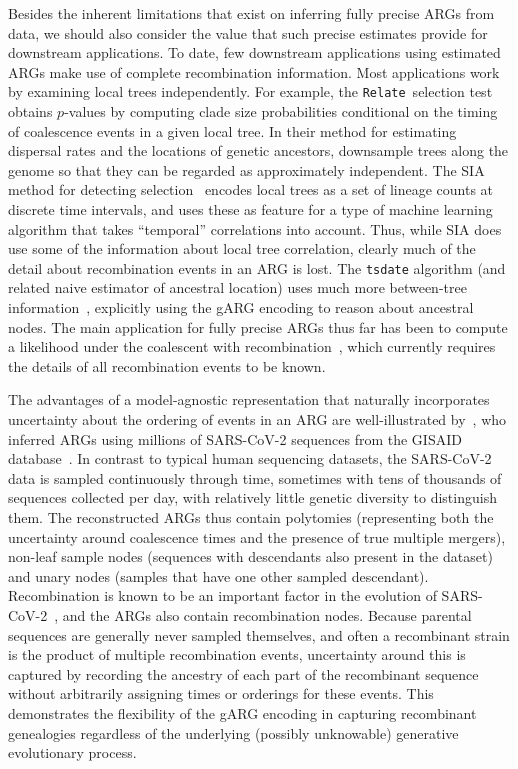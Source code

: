 \documentclass{article}
\newcommand{\relate}[0]{\texttt{Relate}}
\begin{document}
Besides the inherent limitations that exist on inferring fully
precise ARGs from data,
we should also consider the value that such precise estimates provide
for downstream applications.
To date, few downstream applications using estimated ARGs
make use of complete recombination information.
Most applications work by examining local trees independently.
For example, the \relate\ selection test~\citep{speidel2019method}
obtains $p$-values by computing clade size probabilities conditional on the timing of coalescence events in a given local tree.
In their method
for estimating dispersal rates and the locations of genetic
ancestors,
\citep{osmond2021estimating} downsample trees along the genome
so that they can be regarded as approximately independent.
The SIA method for detecting selection~\citep{hejase2022deep}
encodes local trees as a set of lineage counts at discrete
time intervals, and uses these as feature for a
type of machine learning algorithm
that takes ``temporal'' correlations into account. Thus,
while SIA does use some of the information about local tree correlation,
clearly much of the detail about recombination
events in an ARG is lost.
The \texttt{tsdate} algorithm (and related naive estimator
of ancestral location) uses much more between-tree
information~\citep{wohns2022unified}, explicitly using the gARG
encoding to reason about ancestral nodes.
The main application for fully precise ARGs thus far has been
to compute a likelihood under the coalescent with
recombination~\citep[e.g.][]{kuhner2000maximum,mahmoudi2022bayesian},
which currently requires the details of all recombination
events to be known.

The advantages of a model-agnostic representation that naturally
incorporates uncertainty about the ordering of events in an ARG are well-illustrated by~\cite{zhan2023towards}, who
inferred ARGs using millions of SARS-CoV-2 sequences from the
GISAID database~\citep{shu2017gisaid}. In contrast to typical human sequencing datasets, the SARS-CoV-2 data is
sampled continuously through time, sometimes with tens of thousands of sequences collected per day, with relatively little genetic diversity to
distinguish them. The reconstructed ARGs thus contain polytomies (representing
both the uncertainty around coalescence times and the presence of true
multiple mergers), non-leaf sample nodes (sequences with descendants
also present in the dataset) and unary nodes (samples that have
one other sampled descendant). Recombination is known
to be an important factor in the evolution of SARS-CoV-2~\citep{vaninsberghe2021recombinant,jackson2021generation,ignatieva2022ongoing},
and the ARGs also contain recombination nodes.
Because parental sequences
are generally never sampled themselves, and often
a recombinant strain is the product of multiple recombination events,
uncertainty around this is captured by recording the ancestry
of each part of the recombinant sequence without arbitrarily assigning
times or orderings for these events. This demonstrates the flexibility of the gARG
encoding in capturing recombinant genealogies regardless of the underlying
(possibly unknowable) generative evolutionary process.
\end{document}

